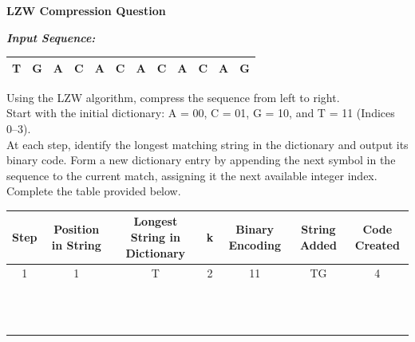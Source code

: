 \documentclass[11pt]{article}
\begin{document}
\begin{center}
{\Large \textbf{LZW Compression Question}}
\end{center}
\vspace{1em}
\noindent \textit{\textbf{Input Sequence:}}
\begin{center}
\renewcommand{\arraystretch}{1.5}
\begin{tabular}{|c|c|c|c|c|c|c|c|c|c|c|c|}
\hline
\rowcolor{white!95!black} T & G & A & C & A & C & A & C & A & C & A & G \\
\hline
\end{tabular}
\end{center}
\vspace{1em}
\noindent Using the LZW algorithm, compress the sequence from left to right. \\[1.5em]
Start with the initial dictionary: A = 00, C = 01, G = 10, and T = 11 (Indices 0--3). \\[1.5em]
At each step, identify the longest matching string in the dictionary and output its binary code. Form a new dictionary entry by appending the next symbol in the sequence to the current match, assigning it the next available integer index. Complete the table provided below.
\vspace{3em}
\par
\begin{center}
\small
\renewcommand{\arraystretch}{1.4}
\begin{tabular}{|c|c|c|c|c|c|c|}
\hline
\rowcolor{lightgray} Step & Position in String & Longest String in Dictionary & k & Binary Encoding & String Added & Code Created \\
\hline
\rowcolor{white!92!black} 1 & 1 & T & 2 & 11 & TG & 4 \\ \hline
 & & & & & & \\ \hline
 & & & & & & \\ \hline
 & & & & & & \\ \hline
 & & & & & & \\ \hline
 & & & & & & \\ \hline
 & & & & & & \\ \hline
 & & & & & & \\ \hline
 & & & & & & \\ \hline
 & & & & & & \\ \hline
 & & & & & & \\ \hline
 & & & & & & \\ \hline
 & & & & & & \\ \hline
\end{tabular}
\end{center}
\vspace{1em}
\end{document}
